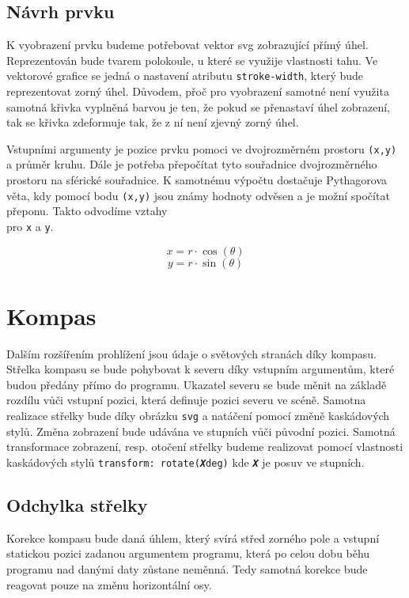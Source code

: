 \subsection{Návrh prvku}
K vyobrazení prvku budeme potřebovat vektor svg zobrazující přímý úhel. Reprezentován bude tvarem polokoule, u které se využije vlastnosti tahu. Ve vektorové grafice se jedná o nastavení atributu \texttt{stroke-width}, který bude reprezentovat zorný úhel. Důvodem, přoč pro vyobrazení samotné není využita samotná křivka vyplněná barvou je ten, že pokud se přenastaví úhel zobrazení, tak se křivka zdeformuje tak, že z ní není zjevný zorný úhel.

Vstupními argumenty je pozice prvku pomoci ve dvojrozměrném prostoru \texttt{(x,y)} a průměr kruhu. Dále je potřeba přepočítat tyto souřadnice dvojrozměrného prostoru na sférické souřadnice. K samotnému výpočtu dostačuje Pythagorova věta, kdy pomocí bodu \texttt{(x,y)} jsou známy hodnoty odvěsen a je možní spočítat přeponu. Takto odvodíme vztahy \\pro \texttt{x} a \texttt{y}.


 $$ x = r\cdot\cos(\theta) $$ 
 $$ y = r\cdot\sin(\theta) $$  

 


\newpage


\section{Kompas}
Dalším rozšířením prohlížení jsou údaje o světových stranách díky kompasu. Střelka kompasu se bude pohybovat k severu díky vstupním argumentům, které budou předány přímo do programu. Ukazatel severu se bude měnit na základě rozdílu vůči vstupní pozici, která definuje pozici severu ve scéně. Samotna realizace střelky bude díky obrázku \texttt{svg} a natáčení pomocí změně kaskádových stylů. Změna zobrazení bude udávána ve stupních vůči původní pozici. Samotná transformace zobrazení, resp. otočení střelky budeme realizovat pomocí vlastnosti kaskádových stylů \texttt{transform: rotate(\textbf{\emph{X}}deg)} kde \texttt{\textbf{\emph{X}}} je posuv ve stupních.

\subsection{Odchylka střelky}
Korekce kompasu bude daná úhlem, který svírá střed zorného pole a vstupní statickou pozici zadanou argumentem programu, která po celou dobu běhu programu nad danými daty zůstane neměnná. Tedy samotná korekce bude reagovat pouze na změnu horizontální osy.

